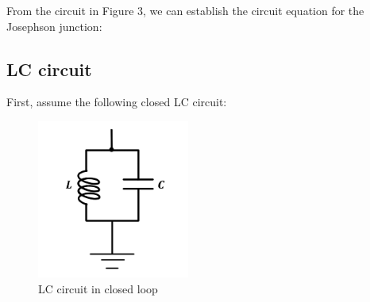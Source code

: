 \documentclass{article}[12pt]
\numberwithin{equation}{section}
\begin{document}
From the circuit in Figure 3, we can establish the circuit equation for the Josephson junction:

\subsection{LC circuit}

First, assume the following closed LC circuit:

\begin{figure}[htbp]
    \centerline{\includegraphics[width=5cm]{TexFigure/LCcircuit.png}}
    \caption{LC circuit in closed loop}
    \label{fig:reentrant}
  \end{figure}
\end{document}
